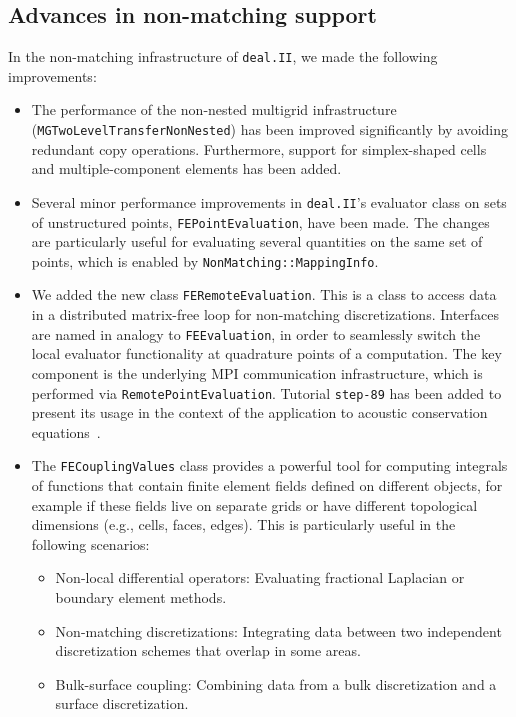 \documentclass{ansarticle-preprint}
\newcommand{\specialword}[1]{\texttt{#1}}
\newcommand{\dealii}{{\specialword{deal.II}}\xspace}
\newcommand{\step}[1]{{\specialword{step-#1}}\xspace}
\begin{document}
\subsection{Advances in non-matching support}\label{sec:nonmatching}

In the non-matching infrastructure of \dealii, we made the following improvements:

\begin{itemize}
\item The performance of the non-nested multigrid infrastructure
(\texttt{MGTwoLevelTransferNon\-Nested}) has been improved significantly by avoiding
redundant copy operations. Furthermore, support for simplex-shaped cells and
multiple-component elements has been added.
\item Several minor performance improvements in \dealii's evaluator class on
  sets of unstructured points, \texttt{FEPointEvaluation}, have been
  made. The changes are particularly useful for evaluating several quantities on the
  same set of points, which is enabled by \texttt{NonMatching::MappingInfo}.
\item We added the new class \texttt{FERemoteEvaluation}.
This is a class to access data
in a distributed matrix-free loop for non-matching discretizations.
Interfaces are named in analogy to \texttt{FEEvaluation}, in order to seamlessly switch the
local evaluator functionality at quadrature points of a computation. The key component is the
underlying MPI communication infrastructure, which is performed via \texttt{RemotePointEvaluation}.
Tutorial \step{89} has been added to present its usage
in the context of the application to acoustic conservation equations~\cite{heinz2023high}.

\item The \texttt{FECouplingValues} class provides a powerful tool for
 computing
 integrals of functions that contain finite element fields defined on
 different objects, for example if these fields
 live on separate grids or have different topological dimensions (e.g., cells,
 faces, edges). This is particularly useful in the following scenarios: 
 \begin{itemize}
  \item Non-local differential operators: Evaluating fractional Laplacian or
  boundary element methods.  
  \item Non-matching discretizations: Integrating data between two independent
  discretization schemes that overlap in some areas. 
  \item Bulk-surface coupling: Combining data from a bulk discretization and
  a surface discretization.
 \end{itemize}


\end{itemize}
\end{document}
